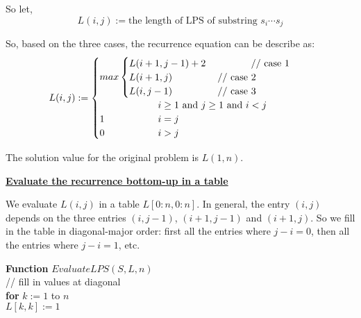\documentclass[11pt]{article}
\begin{document}
\begin{enumerate}
  So let,
  \begin{equation}
    L(i, j) := \text{the length of LPS of substring } s_i \cdots s_j
  \end{equation}

  So, based on the three cases, the recurrence equation can be
  describe as:
  \begin{equation}
    L(i,j) := \begin{cases}
      max \begin{cases}
        L(i+1, j-1) + 2 \text{ \hspace{4em} // case 1} \\
        L(i+1, j) \text{ \hspace{4em} // case 2} \\
        L(i, j-1) \text{ \hspace{4em} // case 3} \\
      \end{cases}\\
      \-\hspace{6em} i \geq 1 \text{ and } j \geq 1 \text{ and } i < j \\

      1 \-\hspace{5.5em} i = j \\
      0 \-\hspace{5.5em} i > j \\
    \end{cases}
  \end{equation}

  The solution value for the original problem is $L(1, n)$.

  \underline{\textbf{Evaluate the recurrence bottom-up in a table}}

  We evaluate $L(i,j)$ in a table $L[0:n, 0:n]$.
  In general, the entry $(i,j)$ depends on the three entries $(i,
  j-1)$, $(i+1, j-1)$ and $(i+1, j)$. So we fill in the table 
  in diagonal-major order: first all the entries where $j-i=0$, then
  all the entries where $j-i=1$, etc.

  \textbf{Function} $EvaluateLPS(S, L, n)$\\
  \-\hspace{2em} // fill in values at diagonal\\
  \-\hspace{2em} \textbf{for} $k := 1$ to $n$\\
  \-\hspace{4em} $L[k,k] := 1$ \\


\end{enumerate}
\end{document}
